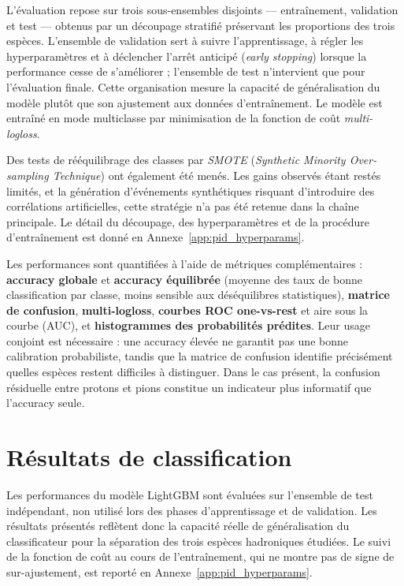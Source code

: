 L'évaluation repose sur trois sous-ensembles disjoints — entraînement, validation et test — obtenus par un découpage stratifié préservant les proportions des trois espèces. L'ensemble de validation sert à suivre l'apprentissage, à régler les hyperparamètres et à déclencher l'arrêt anticipé (\emph{early stopping}) lorsque la performance cesse de s'améliorer ; l'ensemble de test n'intervient que pour l'évaluation finale. Cette organisation mesure la capacité de généralisation du modèle plutôt que son ajustement aux données d'entraînement. Le modèle est entraîné en mode multiclasse par minimisation de la fonction de coût \emph{multi-logloss}.

Des tests de rééquilibrage des classes par \emph{SMOTE} (\emph{Synthetic Minority Over-sampling Technique}) ont également été menés. Les gains observés étant restés limités, et la génération d'événements synthétiques risquant d'introduire des corrélations artificielles, cette stratégie n'a pas été retenue dans la chaîne principale. Le détail du découpage, des hyperparamètres et de la procédure d'entraînement est donné en Annexe~\ref{app:pid_hyperparams}.

Les performances sont quantifiées à l'aide de métriques complémentaires : \textbf{accuracy globale} et \textbf{accuracy équilibrée} (moyenne des taux de bonne classification par classe, moins sensible aux déséquilibres statistiques), \textbf{matrice de confusion}, \textbf{multi-logloss}, \textbf{courbes ROC one-vs-rest} et aire sous la courbe (AUC), et \textbf{histogrammes des probabilités prédites}. Leur usage conjoint est nécessaire : une accuracy élevée ne garantit pas une bonne calibration probabiliste, tandis que la matrice de confusion identifie précisément quelles espèces restent difficiles à distinguer. Dans le cas présent, la confusion résiduelle entre protons et pions constitue un indicateur plus informatif que l'accuracy seule.

\section{Résultats de classification}
\label{sec:pid-resultats}

Les performances du modèle LightGBM sont évaluées sur l'ensemble de test indépendant, non utilisé lors des phases d'apprentissage et de validation. Les résultats présentés reflètent donc la capacité réelle de généralisation du classificateur pour la séparation des trois espèces hadroniques étudiées. Le suivi de la fonction de coût au cours de l'entraînement, qui ne montre pas de signe de sur-ajustement, est reporté en Annexe~\ref{app:pid_hyperparams}.

